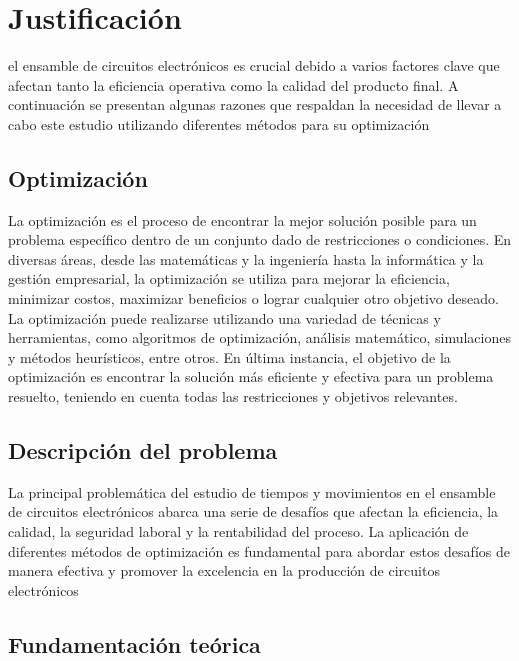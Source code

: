      \section{Justificación}
     
     el ensamble de circuitos electrónicos es crucial debido a varios factores clave que afectan tanto la eficiencia operativa como la calidad del producto final. A continuación se presentan algunas razones que respaldan la necesidad de llevar a cabo este estudio utilizando diferentes métodos para su optimización
     
     \subsection{Optimización}
     
     La optimización es el proceso de encontrar la mejor solución posible para un problema específico dentro de un conjunto dado de restricciones o condiciones. En diversas áreas, desde las matemáticas y la ingeniería hasta la informática y la gestión empresarial, la optimización se utiliza para mejorar la eficiencia, minimizar costos, maximizar beneficios o lograr cualquier otro objetivo deseado. 
     La optimización puede realizarse utilizando una variedad de técnicas y herramientas, como algoritmos de optimización, análisis matemático, simulaciones y métodos heurísticos, entre otros. En última instancia, el objetivo de la optimización es encontrar la solución más eficiente y efectiva para un problema resuelto, teniendo en cuenta todas las restricciones y objetivos relevantes.
     
     \subsection{Descripción del problema}
     
     La principal problemática del estudio de tiempos y movimientos en el ensamble de circuitos electrónicos abarca una serie de desafíos que afectan la eficiencia, la calidad, la seguridad laboral y la rentabilidad del proceso. La aplicación de diferentes métodos de optimización es fundamental para abordar estos desafíos de manera efectiva y promover la excelencia en la producción de circuitos electrónicos
     
     \subsection{Fundamentación teórica}
     

